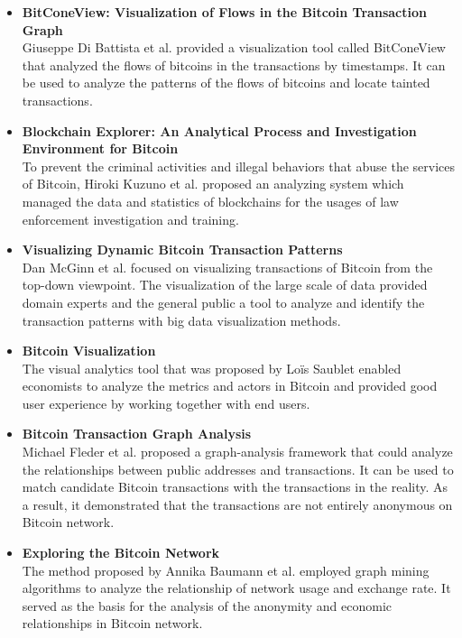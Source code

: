 \begin{itemize}
    \item \textbf{BitConeView: Visualization of Flows in the Bitcoin Transaction Graph} \cite{Battista2015} \\
        Giuseppe Di Battista et al. provided a visualization tool called BitConeView that analyzed the flows of bitcoins in the transactions by timestamps. It can be used to analyze the patterns of the flows of bitcoins and locate tainted transactions.
    \item \textbf{Blockchain Explorer: An Analytical Process and Investigation Environment for Bitcoin} \cite{Kuzuno2017} \\
        To prevent the criminal activities and illegal behaviors that abuse the services of Bitcoin, Hiroki Kuzuno et al. proposed an analyzing system which managed the data and statistics of blockchains for the usages of law enforcement investigation and training.
    \item \textbf{Visualizing Dynamic Bitcoin Transaction Patterns} \cite{McGinn2016} \\
        Dan McGinn et al. focused on visualizing transactions of Bitcoin from the top-down viewpoint. The visualization of the large scale of data provided domain experts and the general public a tool to analyze and identify the transaction patterns with big data visualization methods.
    \item \textbf{Bitcoin Visualization} \cite{Saublet2015} \\
        The visual analytics tool that was proposed by Loïs Saublet enabled economists to analyze the metrics and actors in Bitcoin and provided good user experience by working together with end users.
    \item \textbf{Bitcoin Transaction Graph Analysis} \cite{Fleder2015} \\
        Michael Fleder et al. proposed a graph-analysis framework that could analyze the relationships between public addresses and transactions. It can be used to match candidate Bitcoin transactions with the transactions in the reality. As a result, it demonstrated that the transactions are not entirely anonymous on Bitcoin network.
    \item \textbf{Exploring the Bitcoin Network} \cite{Baumann2014} \\
        The method proposed by Annika Baumann et al. employed graph mining algorithms to analyze the relationship of network usage and exchange rate. It served as the basis for the analysis of the anonymity and economic relationships in Bitcoin network.
\end{itemize}

